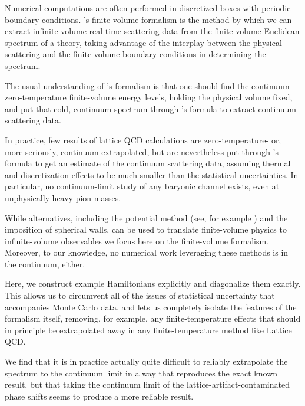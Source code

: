 Numerical computations are often performed in discretized boxes with periodic boundary conditions.
\Luscher's finite-volume formalism\cite{Hamber198399,luscher:1986I,luscher:1986II,wiese1989,Luscher1991,Luscher1991237} is the method by which we can extract infinite-volume real-time scattering data from the finite-volume Euclidean spectrum of a theory, taking advantage of the interplay between the physical scattering and the finite-volume boundary conditions in determining the spectrum.

The usual understanding of \Luscher's formalism is that one should find the continuum zero-temperature finite-volume energy levels, holding the physical volume fixed, and put that cold, continuum spectrum through \Luscher's formula to extract continuum scattering data.

In practice, few results of lattice QCD calculations are zero-temperature- or, more seriously, continuum-extrapolated, but are nevertheless put through \Luscher's formula to get an estimate of the continuum scattering data, assuming thermal and discretization effects to be much smaller than the statistical uncertainties.
In particular, no continuum-limit study of any baryonic channel exists, even at unphysically heavy pion masses.

While alternatives, including the potential method (see, for example ) and the imposition of spherical walls\cite{Borasoy:2007vy,Borasoy:2007vi,Lee:2008fa,Epelbaum:2008vj,Epelbaum:2010xt,Elhatisari:2015iga,Elhatisari:2016owd,Elhatisari:2016hby,Klein:2018lqz,Li:2019ldq,Bovermann:2019jbt}, can be used to translate finite-volume physics to infinite-volume observables we focus here on the \Luscher finite-volume formalism.
Moreover, to our knowledge, no numerical work leveraging these methods is in the continuum, either.

Here, we construct example Hamiltonians explicitly and diagonalize them exactly.
This allows us to circumvent all of the issues of statistical uncertainty that accompanies Monte Carlo data, and lets us completely isolate the features of the formalism itself, removing, for example, any finite-temperature effects that should in principle be extrapolated away in any finite-temperature method like Lattice QCD.

We find that it is in practice actually quite difficult to reliably extrapolate the spectrum to the continuum limit in a way that reproduces the exact known result, but that taking the continuum limit of the lattice-artifact-contaminated phase shifts seems to produce a more reliable result.

